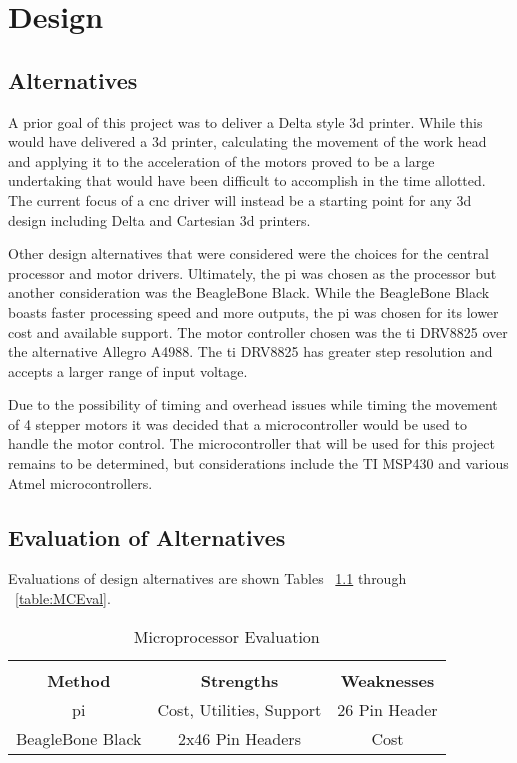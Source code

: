 \chapter{Design}
\section{Alternatives}
A prior goal of this project was to deliver a Delta style \gls{3d} printer.
While this would have delivered a \gls{3d} printer, calculating the movement of the work head and applying it to the acceleration of the motors proved to be a large undertaking that would have been difficult to accomplish in the time allotted.
The current focus of a \gls{cnc} driver will instead be a starting point for any \gls{3d} design including Delta and Cartesian \gls{3d} printers.

Other design alternatives that were considered were the choices for the central processor and motor drivers.
Ultimately, the \gls{pi} was chosen as the processor but another consideration was the BeagleBone Black.
While the BeagleBone Black boasts faster processing speed and more outputs, the \gls{pi} was chosen for its lower cost and available support.
The motor controller chosen was the \gls{ti} DRV8825 over the alternative Allegro A4988. The \gls{ti} DRV8825 has greater step resolution and accepts a larger range of input voltage.

Due to the possibility of timing and overhead issues while timing the movement of 4 stepper motors it was decided that a microcontroller would be used to handle the motor control.
The microcontroller that will be used for this project remains to be determined, but considerations include the TI MSP430 and various Atmel microcontrollers.

\section{Evaluation of Alternatives}
Evaluations of design alternatives are shown Tables ~\ref{table:uPEval} through ~\ref{table:MCEval}.

\begin{table}[ht]
	\caption{Microprocessor Evaluation}
	\label{table:uPEval}
	\centering
	\begin{tabular}{c c c}
	\hline \hline \\
		\textbf{Method} & \textbf{Strengths} & \textbf{Weaknesses}\\
		\gls{pi} & Cost, Utilities, Support & 26 Pin Header\\
		BeagleBone Black & 2x46 Pin Headers & Cost\\
	\end{tabular}
\end{table}

